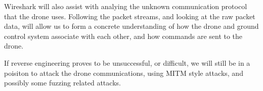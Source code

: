 \documentclass[IEEEtran,letterpaper,10pt,titlepage,draftclsnofoot,onecolumn]{article}
\begin{document}
Wireshark will also assist with analying the unknown communication protocol that the drone uses. Following the packet
streams, and looking at the raw packet data, will allow us to form a concrete understanding of how the drone and
ground control system associate with each other, and how commands are sent to the drone\cite{UknProto}.

If reverse engineering proves to be unsuccessful, or difficult, we will still be in a poisiton to attack the drone
communications, using MITM style attacks, and possibly some fuzzing related attacks\cite{Fuzzy}.

\newpage


\end{document}
